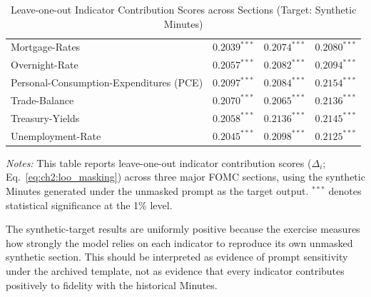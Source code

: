 \begin{table}[htbp]
\begin{threeparttable}
\begin{tabular}{p{3.6cm} p{4.3cm} p{3.1cm} p{3.1cm}}
Mortgage-Rates & $0.2039^{***}$ & $0.2074^{***}$ & $0.2080^{***}$ \\
Overnight-Rate & $0.2057^{***}$ & $0.2082^{***}$ & $0.2094^{***}$ \\
Personal-Consumption-Expenditures (PCE) & $0.2097^{***}$ & $0.2084^{***}$ & $0.2154^{***}$ \\
Trade-Balance & $0.2070^{***}$ & $0.2065^{***}$ & $0.2136^{***}$ \\
Treasury-Yields & $0.2058^{***}$ & $0.2136^{***}$ & $0.2145^{***}$ \\
Unemployment-Rate & $0.2045^{***}$ & $0.2098^{***}$ & $0.2125^{***}$ \\
\bottomrule
\end{tabular}
\begin{tablenotes}[flushleft]
\footnotesize
\item \textit{Notes:} This table reports leave-one-out indicator contribution scores ($\Delta_i$; Eq.~\ref{eq:ch2:loo_masking}) across three major FOMC sections, using the synthetic Minutes generated under the unmasked prompt as the target output. 
$^{***}$ denotes statistical significance at the 1\% level.
\end{tablenotes}
\caption{Leave-one-out Indicator Contribution Scores across Sections (Target: Synthetic Minutes)}
\label{tab:ch2:shapley_result}
\end{threeparttable}
\end{table}

The synthetic-target results are uniformly positive because the exercise measures how strongly the model relies on each indicator to reproduce its own unmasked synthetic section. This should be interpreted as evidence of prompt sensitivity under the archived template, not as evidence that every indicator contributes positively to fidelity with the historical Minutes.


